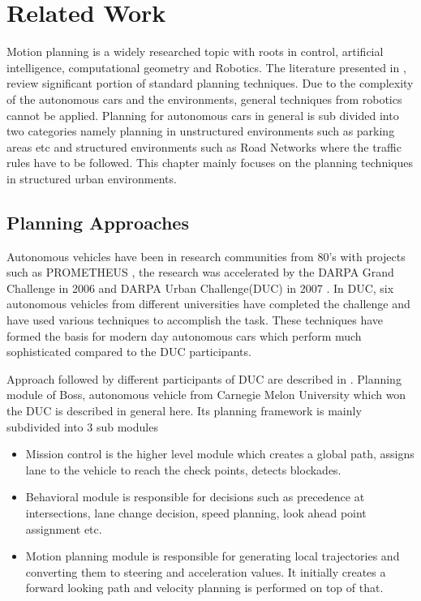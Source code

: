 \chapter{Related Work}
\label{related_work}
Motion planning is a widely researched topic with roots in control, artificial intelligence, computational geometry and Robotics. The literature presented in \cite{book_robot_motion_planning}, \cite{book_lavelle_planning} review significant portion of standard planning techniques. Due to the complexity of the autonomous cars and the environments, general techniques from robotics cannot be applied. Planning for autonomous cars in general is sub divided into two categories namely planning in unstructured environments such as parking areas etc and structured environments such as Road Networks where the traffic rules have to be followed. This chapter mainly focuses on the planning techniques in structured urban environments. 

\section{Planning Approaches}
\label{planning_aproaches}

Autonomous vehicles have been in research communities from 80's with projects such as PROMETHEUS \cite{prometheus}, the research was accelerated by the DARPA Grand Challenge in 2006 and DARPA Urban Challenge(DUC) in 2007 \cite{darpa_urban_challenge}. In DUC, six autonomous vehicles from different universities have completed the challenge and have used various techniques to accomplish the task. These techniques have formed the basis for modern day autonomous cars which perform much sophisticated compared to the DUC participants. 

Approach followed by different participants of DUC are described in \cite{darpa_urban_challenge}. Planning module of Boss, autonomous vehicle from Carnegie Melon University which won the DUC is described in general here. Its planning framework is mainly subdivided into 3 sub modules 

\begin{itemize}
	\item Mission control is the higher level module which creates a global path, assigns lane to the vehicle to reach the check points, detects blockades.
	\item Behavioral module is responsible for decisions such as precedence at intersections, lane change decision, speed planning, look ahead point assignment etc. 
	\item Motion planning module is responsible for generating local trajectories and converting them to steering and acceleration values. It initially creates a forward looking path and velocity planning is performed on top of that. 
\end{itemize}

